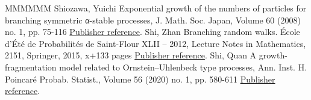 \begin{thebibliography}{MMMMMM}
 Shiozawa, Yuichi Exponential growth of the numbers of particles for branching symmetric α-stable processes, J. Math. Soc. Japan, Volume 60 (2008) no. 1, pp. 75-116 \href{https://ahl.centre-mersenne.org/item/AHL_2020__3__795_0/#Shio}{Publisher reference}.
 Shi, Zhan Branching random walks. École d’Été de Probabilités de Saint-Flour XLII – 2012, Lecture Notes in Mathematics, 2151, Springer, 2015, x+133 pages \href{https://ahl.centre-mersenne.org/item/AHL_2020__3__795_0/#Shi}{Publisher reference}.
 Shi, Quan A growth-fragmentation model related to Ornstein–Uhlenbeck type processes, Ann. Inst. H. Poincaré Probab. Statist., Volume 56 (2020) no. 1, pp. 580-611 \href{https://ahl.centre-mersenne.org/item/AHL_2020__3__795_0/#ShiQ-ou}{Publisher reference}.
\end{thebibliography}
